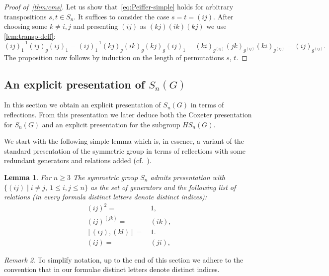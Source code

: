 \documentclass[oneside, 10pt]{amsart}
\theoremstyle{plain}
\numberwithin{equation}{section}
\newtheorem{lemma}{Lemma}
\numberwithin{lemma}{section}
\theoremstyle{remark}
\newtheorem{rem}[lemma]{Remark}
\theoremstyle{definition}
\begin{document}
\begin{proof}[Proof of~\cref{thm:cms}]
Let us show that~\eqref{eq:Peiffer-simple} holds for arbitrary transpositions $s, t \in S_n$.
It suffices to consider the case $s=t=(ij)$. 
After choosing some $k\neq i,j$ and presenting $(ij)$ as $(kj)(ik)(kj)$ we use \cref{lem:transp-deff}:
\begin{equation} \nonumber (ij)^{-1}_1 (ij)_g (ij)_1 = (ij)^{-1}_1 (kj)_g (ik)_g (kj)_g (ij)_1 =
(ki)_{g^{(ij)}} (jk)_{g^{(ij)}} (ki)_{g^{(ij)}} = (ij)_{g^{(ij)}}. \end{equation}
The proposition now follows by induction on the length of permutations $s$, $t$.
\end{proof}

\subsection{An explicit presentation of $S_n(G)$}
In this section we obtain an explicit presentation of $S_n(G)$ in terms of reflections.
From this presentation we later deduce both the Coxeter presentation for $S_n(G)$ and
 an explicit presentation for the subgroup $HS_n(G)$.

We start with the following simple lemma which is, in essence, a variant of the standard presentation of the symmetric group in terms of reflections
 with some redundant generators and relations added (cf.~\cite[Theorem~2.4.3]{Ca89}).
\begin{lemma} \label{lm:Snpres} For $n\geq 3$ The symmetric group $S_n$ admits presentation with 
$\{(ij) \mid i\neq j,\ 1\leq i,j\leq n\}$ as the set of generators and the following list of relations
 (in every formula distinct letters denote distinct indices):
\begin{align}
(ij)^2 = &\, 1,         \label{Sym1} \\
(ij)^{(jk)} = &\, (ik), \label{Sym2} \\
[(ij), (kl)] = &\,1.    \label{Sym3} \\
(ij) =&\, (ji),         \label{Sym0}
\end{align}
\end{lemma}
\begin{rem}
To simplify notation, up to the end of this section we adhere to the convention that in our formulae distinct letters denote distinct indices.
\end{rem}
\end{document}
